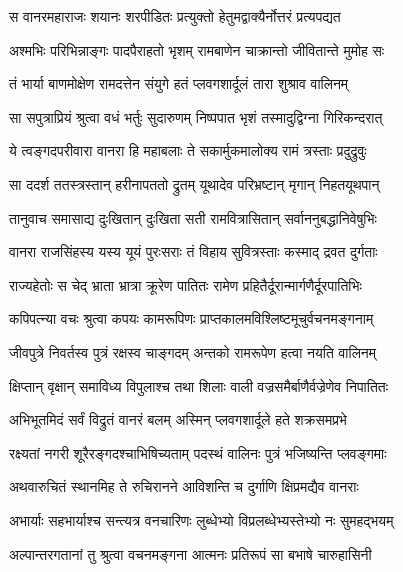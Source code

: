 
\twolineshloka
{स वानरमहाराजः शयानः शरपीडितः}
{प्रत्युक्तो हेतुमद्वाक्यैर्नोत्तरं प्रत्यपद्यत} %

\twolineshloka
{अश्मभिः परिभिन्नाङ्गः पादपैराहतो भृशम्}
{रामबाणेन चाक्रान्तो जीवितान्ते मुमोह सः} %

\twolineshloka
{तं भार्या बाणमोक्षेण रामदत्तेन संयुगे}
{हतं प्लवगशार्दूलं तारा शुश्राव वालिनम्} %

\twolineshloka
{सा सपुत्राप्रियं श्रुत्वा वधं भर्तुः सुदारुणम्}
{निष्पपात भृशं तस्मादुद्विग्ना गिरिकन्दरात्} %

\twolineshloka
{ये त्वङ्गदपरीवारा वानरा हि महाबलाः}
{ते सकार्मुकमालोक्य रामं त्रस्ताः प्रदुद्रुवुः} %

\twolineshloka
{सा ददर्श ततस्त्रस्तान् हरीनापततो द्रुतम्}
{यूथादेव परिभ्रष्टान् मृगान् निहतयूथपान्} %

\twolineshloka
{तानुवाच समासाद्य दुःखितान् दुःखिता सती}
{रामवित्रासितान् सर्वाननुबद्धानिवेषुभिः} %

\twolineshloka
{वानरा राजसिंहस्य यस्य यूयं पुरःसराः}
{तं विहाय सुवित्रस्ताः कस्माद् द्रवत दुर्गताः} %

\twolineshloka
{राज्यहेतोः स चेद् भ्राता भ्रात्रा क्रूरेण पातितः}
{रामेण प्रहितैर्दूरान्मार्गणैर्दूरपातिभिः} %

\twolineshloka
{कपिपत्न्या वचः श्रुत्वा कपयः कामरूपिणः}
{प्राप्तकालमविश्लिष्टमूचुर्वचनमङ्गनाम्} %

\twolineshloka
{जीवपुत्रे निवर्तस्व पुत्रं रक्षस्व चाङ्गदम्}
{अन्तको रामरूपेण हत्वा नयति वालिनम्} %

\twolineshloka
{क्षिप्तान् वृक्षान् समाविध्य विपुलाश्च तथा शिलाः}
{वाली वज्रसमैर्बाणैर्वज्रेणेव निपातितः} %

\twolineshloka
{अभिभूतमिदं सर्वं विद्रुतं वानरं बलम्}
{अस्मिन् प्लवगशार्दूले हते शक्रसमप्रभे} %

\twolineshloka
{रक्ष्यतां नगरी शूरैरङ्गदश्चाभिषिच्यताम्}
{पदस्थं वालिनः पुत्रं भजिष्यन्ति प्लवङ्गमाः} %

\twolineshloka
{अथवारुचितं स्थानमिह ते रुचिरानने}
{आविशन्ति च दुर्गाणि क्षिप्रमद्यैव वानराः} %

\twolineshloka
{अभार्याः सहभार्याश्च सन्त्यत्र वनचारिणः}
{लुब्धेभ्यो विप्रलब्धेभ्यस्तेभ्यो नः सुमहद्भयम्} %

\twolineshloka
{अल्पान्तरगतानां तु श्रुत्वा वचनमङ्गना}
{आत्मनः प्रतिरूपं सा बभाषे चारुहासिनी} %


